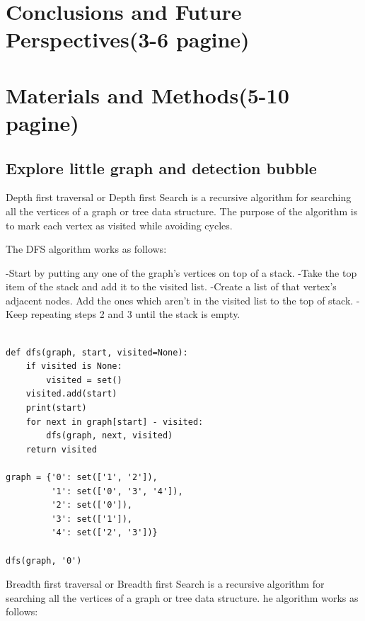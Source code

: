 \documentclass[
tikz,
11pt, %
oneside, %
english, %
singlespacing, %
headsepline, %
]{MastersDoctoralThesisV2} %
\begin{document}




\chapter{Conclusions and Future Perspectives(3-6 pagine)}





\chapter{Materials and Methods(5-10 pagine)}

\section{Explore little graph and detection bubble}  Depth first traversal or Depth first Search is a recursive algorithm for searching all the vertices of a graph or tree data structure. The purpose of the algorithm is to mark each vertex as visited while avoiding cycles.

The DFS algorithm works as follows:

-Start by putting any one of the graph's vertices on top of a stack.
-Take the top item of the stack and add it to the visited list.
-Create a list of that vertex's adjacent nodes. Add the ones which aren't in the visited list to the top of stack.
-Keep repeating steps 2 and 3 until the stack is empty.
\\ 

\begin{verbatim}

def dfs(graph, start, visited=None):
    if visited is None:
        visited = set()
    visited.add(start)
    print(start)
    for next in graph[start] - visited:
        dfs(graph, next, visited)
    return visited

graph = {'0': set(['1', '2']),
         '1': set(['0', '3', '4']),
         '2': set(['0']),
         '3': set(['1']),
         '4': set(['2', '3'])}

dfs(graph, '0')
\end{verbatim}

Breadth first traversal or Breadth first Search is a recursive algorithm for searching all the vertices of a graph or tree data structure.
he algorithm works as follows:
\end{document}
